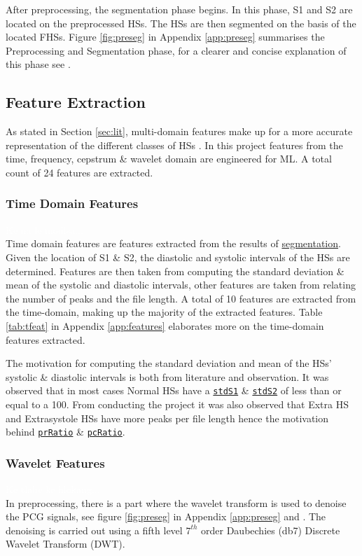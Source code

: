 \documentclass[10pt,twocolumn]{witseiepaper}
\begin{document}
After preprocessing, the segmentation phase begins. In this phase, S1 and S2 are located on the preprocessed HSs. The HSs are then segmented on the basis of the located FHSs. Figure \ref{fig:preseg} in Appendix \ref{app:preseg} summarises the Preprocessing and Segmentation phase, for a clearer and concise explanation of this phase see \cite{love}.

\subsection{Feature Extraction}
\label{sec:feat}
As stated in Section \ref{sec:lit}, multi-domain features make up for a more accurate representation of the different classes of HSs \cite{22,44}. In this project features from the time, frequency, cepstrum \& wavelet domain are engineered for ML. A total count of 24 features are extracted.

\subsubsection{Time Domain Features}
\textcolor{white}{Ke na le modisa...}\\
Time domain features are features extracted from the results of \hyperref[sec:preseg]{segmentation}. Given the location of S1 \& S2, the diastolic and systolic intervals of the HSs are determined. Features are then taken from computing the standard deviation \& mean of the systolic and diastolic intervals, other features are taken from relating the number of peaks and the file length. A total of 10 features are extracted from the time-domain, making up the majority of the extracted features. Table \ref{tab:tfeat} in Appendix \ref{app:features} elaborates more on the time-domain features extracted.

The motivation for computing the standard deviation and mean of the HSs' systolic \& diastolic intervals is both from literature \cite{gomes2012classifying,bentley} and observation. It was observed that in most cases Normal HSs have a \hyperref[t:s1]{\texttt{stdS1}} \& \hyperref[t:s2]{\texttt{stdS2}} of less than or equal to a 100. From conducting the project it was also observed that Extra HS and Extrasystole HSs have more peaks per file length hence the motivation behind \hyperref[t:pr]{\texttt{prRatio}} \& \hyperref[t:pc]{\texttt{pcRatio}}.

\subsubsection{Wavelet Features}
\textcolor{white}{Ke tlabe ke hlokang...}\\
In preprocessing, there is a part where the wavelet transform is used to denoise the PCG signals, see figure \ref{fig:preseg} in Appendix \ref{app:preseg} and \cite{love}. The denoising is carried out using a fifth level $7^{th}$ order Daubechies (db7) Discrete Wavelet Transform (DWT). 
\end{document}
